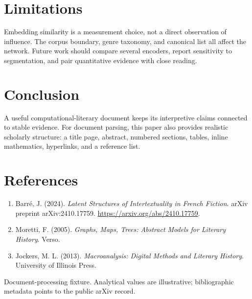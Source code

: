 \documentclass[11pt,a4paper]{article}
\begin{document}
\section{Limitations}
Embedding similarity is a measurement choice, not a direct observation of influence. The corpus boundary, genre taxonomy, and canonical list all affect the network. Future work should compare several encoders, report sensitivity to segmentation, and pair quantitative evidence with close reading.
\section{Conclusion}
A useful computational-literary document keeps its interpretive claims connected to stable evidence. For document parsing, this paper also provides realistic scholarly structure: a title page, abstract, numbered sections, tables, inline mathematics, hyperlinks, and a reference list.
\section*{References}
\begin{enumerate}
\item Barré, J. (2024). \emph{Latent Structures of Intertextuality in French Fiction}. arXiv preprint arXiv:2410.17759. \url{https://arxiv.org/abs/2410.17759}.
\item Moretti, F. (2005). \emph{Graphs, Maps, Trees: Abstract Models for Literary History}. Verso.
\item Jockers, M. L. (2013). \emph{Macroanalysis: Digital Methods and Literary History}. University of Illinois Press.
\end{enumerate}
\vfill
{\small\color{muted}Document-processing fixture. Analytical values are illustrative; bibliographic metadata points to the public arXiv record.}
\end{document}
